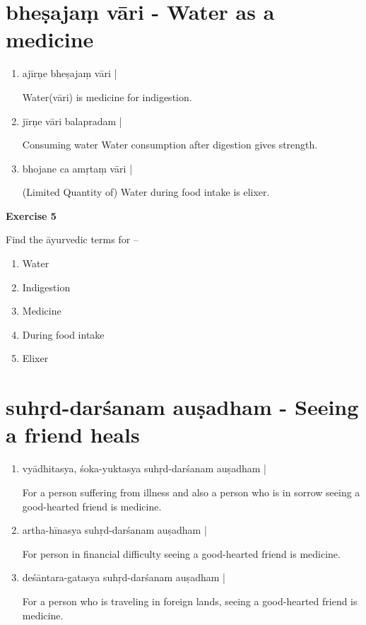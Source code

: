 \chapter{bheṣajaṃ vāri - Water as a medicine}

\begin{enumerate}
\item {}

ajīrṇe bheṣajaṃ vāri |

Water(vāri) is medicine for indigestion.

\item {}

jīrṇe vāri balapradam |

Consuming water Water consumption after digestion gives strength.

\item {}

bhojane ca amṛtaṃ vāri | 

(Limited Quantity of) Water during food intake is elixer. 
\end{enumerate}

\begin{center}
\textbf{\large Exercise 5}
\end{center}

Find the āyurvedic terms for –
\begin{enumerate}
\renewcommand{\theenumi}{\alph{enumi}}
\renewcommand{\labelenumi}{\theenumi.}
\item Water
\item Indigestion
\item Medicine
\item During food intake
\item Elixer
\end{enumerate} 

\chapter{suhṛd-darśanam auṣadham - Seeing a friend heals}

\begin{enumerate}
\item {}

vyādhitasya, śoka-yuktasya suhṛd-darśanam auṣadham |

For a person suffering from illness and also a person who is in sorrow seeing a good-hearted friend is medicine. 

\item {}

artha-hīnasya suhṛd-darśanam auṣadham |

For person in financial difficulty seeing a good-hearted friend is medicine. 

\item {}

deśāntara-gatasya suhṛd-darśanam auṣadham |

For a person who is traveling in foreign lands, seeing a good-hearted friend is medicine.
\end{enumerate}

